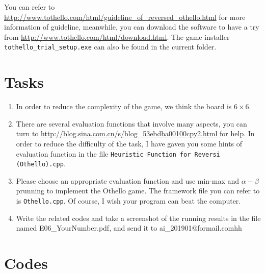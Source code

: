 \documentclass[a4paper, 11pt]{article}
\begin{document}
You can refer to \url{http://www.tothello.com/html/guideline_of_reversed_othello.html} for more information of guideline, meanwhile, you can download the software to have a try from \url{http://www.tothello.com/html/download.html}. The game installer \texttt{tothello\_trial\_setup.exe} can also be found in the current folder.



\section{Tasks}
\begin{enumerate}

\item In order to reduce the complexity of the game, we think the board is $6\times 6$.

\item There are several evaluation functions that involve many aspects, you can turn to \url{http://blog.sina.com.cn/s/blog_53ebdba00100cpy2.html} for help. In order to reduce the difficulty of the task, I have gaven you some hints of evaluation function in the file \texttt{Heuristic Function for Reversi (Othello).cpp}.

\item Please choose an appropriate evaluation function and use min-max and $\alpha-\beta$ prunning to implement the Othello game. The framework file you can refer to is \texttt{Othello.cpp}. Of course, I wish your program can beat the computer.

\item Write the related codes and take a screenshot of the running results in the file named \textsf{E06\_YourNumber.pdf}, and send it to \textsf{ai\_201901@formail.comhh}
\end{enumerate}

\section{Codes}
\end{document}
